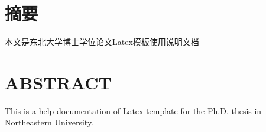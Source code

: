 \chapter{摘\quad 要}%
\linespread{1.5}

本文是东北大学博士学位论文Latex模板使用说明文档

\chapter{\bf{ABSTRACT}}%

This is a help documentation of Latex template for the Ph.D. thesis in Northeastern University.

